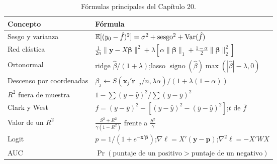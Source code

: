\begin{table}[H]
\centering\small
\begin{tabular}{@{}ll@{}}
\toprule
Concepto & Fórmula \\
\midrule
Sesgo y varianza & $\mathbb{E}[(y_0-\hat f)^2]=\sigma^2+\text{sesgo}^2+\operatorname{Var}(\hat f)$ \\
Red elástica & $\frac1{2n}\lVert\mathbf y-X\boldsymbol\beta\rVert^2+\lambda[\alpha\lVert\boldsymbol\beta\rVert_1+\frac{1-\alpha}{2}\lVert\boldsymbol\beta\rVert_2^2]$ \\
Ortonormal & ridge $\hat\beta/(1+\lambda)$;\quad lasso $\operatorname{signo}(\hat\beta)\max(|\hat\beta|-\lambda,0)$ \\
Descenso por coordenadas & $\beta_j\leftarrow S(\mathbf x_j'\mathbf r_{-j}/n,\lambda\alpha)/(1+\lambda(1-\alpha))$ \\
$R^2$ fuera de muestra & $1-\sum(y-\hat y)^2/\sum(y-\bar y)^2$ \\
Clark y West & $f=(y-\bar y)^2-[(y-\hat y)^2-(\bar y-\hat y)^2]$;\quad $t$ de $\bar f$ \\
Valor de un $R^2$ & $\frac{S^2+R^2}{\gamma(1-R^2)}$ frente a $\frac{S^2}{\gamma}$ \\
Logit & $p=1/(1+e^{-\mathbf x'\boldsymbol\beta})$;\quad $\nabla\ell=X'(\mathbf y-\mathbf p)$;\quad $\nabla^2\ell=-X'WX$ \\
AUC & $\Pr(\text{puntaje de un positivo}>\text{puntaje de un negativo})$ \\
\bottomrule
\end{tabular}
\caption{Fórmulas principales del Capítulo 20.}
\end{table}

